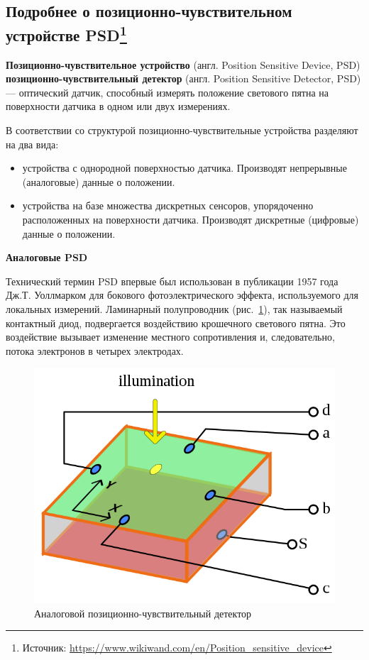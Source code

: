 \documentclass[12pt]{article}
\begin{document}
\subsection[Подробнее о позиционно-чувствительном устройстве PSD]{Подробнее о позиционно-чувствительном устройстве PSD\footnote{Источник: \url{https://www.wikiwand.com/en/Position_sensitive_device}}}


\textbf{Позиционно-чувствительное устройство} (англ. Position Sensitive Device, PSD) \textbf{позиционно-чувствительный детектор} (англ. Position Sensitive Detector, PSD) — оптический датчик, способный измерять положение светового пятна на поверхности датчика в одном или двух измерениях.

В соответствии со структурой позиционно-чувствительные устройства разделяют на два вида:
\begin{itemize}
    \item устройства с однородной поверхностью датчика. Производят непрерывные (аналоговые) данные о положении.
    \item устройства на базе множества дискретных сенсоров, упорядоченно расположенных на поверхности датчика. Производят дискретные (цифровые) данные о положении.
\end{itemize}

\textbf{Аналоговые PSD}

Технический термин PSD впервые был использован в публикации 1957 года Дж.Т. Уоллмарком для бокового фотоэлектрического эффекта, используемого для локальных измерений. Ламинарный полупроводник (рис.~\ref{psd}), так называемый контактный диод, подвергается воздействию крошечного светового пятна. Это воздействие вызывает изменение местного сопротивления и, следовательно, потока электронов в четырех электродах. 

\begin{figure}[H]
    \centering
    \includegraphics[scale=0.4]{images/psd.png}
    \caption{Аналоговой позиционно-чувствительный детектор}\label{psd}
\end{figure}
\end{document}
